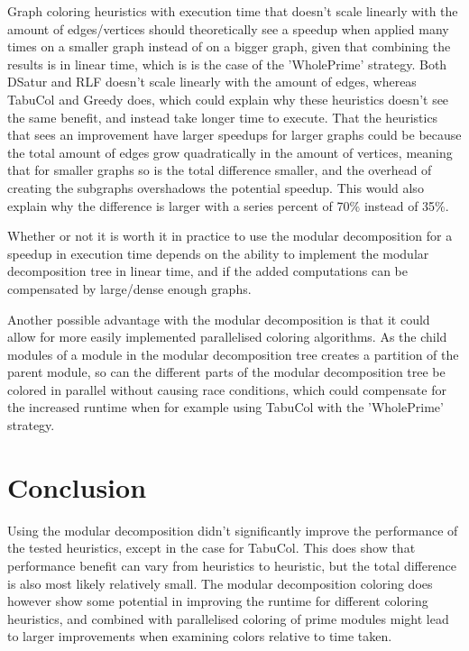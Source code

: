 \documentclass[a4paper]{article}
\begin{document}
Graph coloring heuristics with execution time that doesn't scale linearly with
the amount of edges/vertices should theoretically see a speedup when applied
many times on a smaller graph instead of on a bigger graph, given that
combining the results is in linear time, which is is the case of the
'WholePrime' strategy. Both DSatur and RLF doesn't scale linearly with the
amount of edges, whereas TabuCol and Greedy does, which could explain why these
heuristics doesn't see the same benefit, and instead take longer time to execute. That the heuristics that sees an
improvement have larger speedups for larger graphs could be because the total
amount of edges grow quadratically in the amount of vertices, meaning that for
smaller graphs so is the total difference smaller, and the overhead of creating
the subgraphs overshadows the potential speedup. This would also explain why
the difference is larger with a series percent of 70\% instead of 35\%.

Whether or not it is worth it in practice to use the modular decomposition
for a speedup in execution time depends on the ability to implement the modular
decomposition tree in linear time, and if the added computations can be
compensated by large/dense enough graphs.


Another possible advantage with the modular decomposition is that it could
allow for more easily implemented parallelised coloring algorithms. As the
child modules of a module in the modular decomposition tree creates a partition
of the parent module, so can the different parts of the modular decomposition
tree be colored in parallel without causing race conditions, which could compensate for the increased runtime
when for example using TabuCol with the 'WholePrime' strategy.

\section{Conclusion}

Using the modular decomposition didn't significantly improve the performance of
the tested heuristics, except in the case for TabuCol. This does show that
performance benefit can vary from heuristics to heuristic, but the total
difference is also most likely relatively small. The modular decomposition
coloring does however show some potential in improving the runtime for
different coloring heuristics, and combined with parallelised coloring of prime
modules might lead to larger improvements when examining colors relative to
time taken.
\end{document}
